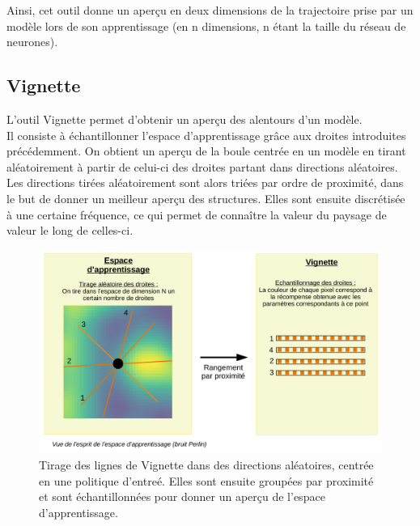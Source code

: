 \documentclass[12pt]{article}
\begin{document}
Ainsi, cet outil donne un aperçu en deux dimensions de la trajectoire prise par un modèle lors de son apprentissage (en n dimensions, n étant la taille du réseau de neurones). \\

\newpage
\subsection{Vignette}

L’outil Vignette permet d’obtenir un aperçu des alentours d’un modèle. \\

Il consiste à échantillonner l’espace d’apprentissage grâce aux droites introduites précédemment. On obtient un aperçu de la boule centrée en un modèle en tirant aléatoirement à partir de celui-ci des droites partant dans directions aléatoires.\\

Les directions tirées aléatoirement sont alors triées par ordre de proximité, dans le but de donner un meilleur aperçu des structures. Elles sont ensuite discrétisée à une certaine fréquence, ce qui permet de connaître la valeur du paysage de valeur le long de celles-ci. \\

\begin{figure}[htp]
    \centering
    \includegraphics[width=12cm]{Images/vignetteDessin}
    \caption{Tirage des lignes de Vignette dans des directions aléatoires, centrée en une politique d'entreé. Elles sont ensuite groupées par proximité et sont échantillonnées pour donner un aperçu de l'espace d'apprentissage.}
    \label{fig:vignetteDessin}
\end{figure}
\end{document}
